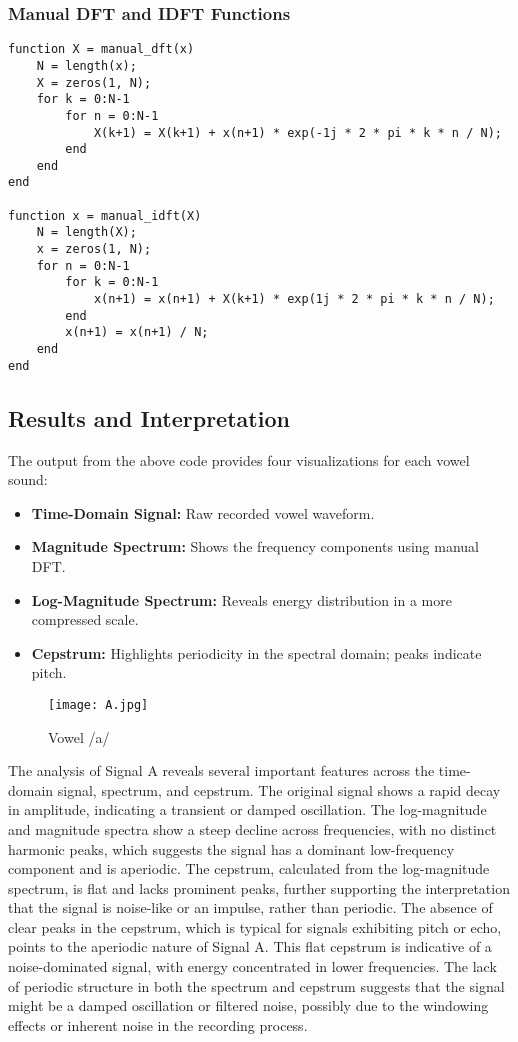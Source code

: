 \documentclass[a4paper,12pt]{article}
\begin{document}
\subsubsection*{Manual DFT and IDFT Functions}
\begin{verbatim}
function X = manual_dft(x)
    N = length(x);
    X = zeros(1, N);
    for k = 0:N-1
        for n = 0:N-1
            X(k+1) = X(k+1) + x(n+1) * exp(-1j * 2 * pi * k * n / N);
        end
    end
end

function x = manual_idft(X)
    N = length(X);
    x = zeros(1, N);
    for n = 0:N-1
        for k = 0:N-1
            x(n+1) = x(n+1) + X(k+1) * exp(1j * 2 * pi * k * n / N);
        end
        x(n+1) = x(n+1) / N;
    end
end
\end{verbatim}

\subsection{Results and Interpretation}

The output from the above code provides four visualizations for each vowel sound:

\begin{itemize}
    \item \textbf{Time-Domain Signal:} Raw recorded vowel waveform.
    \item \textbf{Magnitude Spectrum:} Shows the frequency components using manual DFT.
    \item \textbf{Log-Magnitude Spectrum:} Reveals energy distribution in a more compressed scale.
    \item \textbf{Cepstrum:} Highlights periodicity in the spectral domain; peaks indicate pitch.
\end{itemize}

\begin{figure}[H]
    \centering
    \texttt{[image: A.jpg]}
    \caption{Vowel /a/}
    \label{fig:A}


\end{figure}
The analysis of Signal A reveals several important features across the time-domain signal, spectrum, and cepstrum. The original signal shows a rapid decay in amplitude, indicating a transient or damped oscillation. The log-magnitude and magnitude spectra show a steep decline across frequencies, with no distinct harmonic peaks, which suggests the signal has a dominant low-frequency component and is aperiodic. The cepstrum, calculated from the log-magnitude spectrum, is flat and lacks prominent peaks, further supporting the interpretation that the signal is noise-like or an impulse, rather than periodic.
The absence of clear peaks in the cepstrum, which is typical for signals exhibiting pitch or echo, points to the aperiodic nature of Signal A. This flat cepstrum is indicative of a noise-dominated signal, with energy concentrated in lower frequencies. The lack of periodic structure in both the spectrum and cepstrum suggests that the signal might be a damped oscillation or filtered noise, possibly due to the windowing effects or inherent noise in the recording process.
\end{document}
